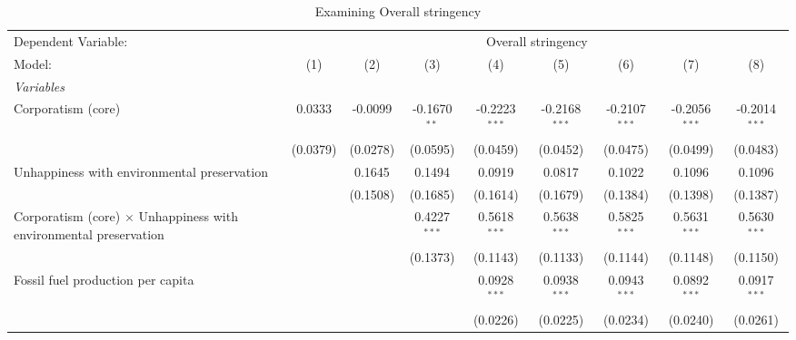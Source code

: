 
\begin{table}[htbp]
   \caption{Examining Overall stringency}
   \centering
   \begin{tabular}{lcccccccc}
      \tabularnewline \midrule \midrule
      Dependent Variable: & \multicolumn{8}{c}{Overall stringency}\\
      Model:                                                                   & (1)      & (2)      & (3)            & (4)             & (5)             & (6)             & (7)             & (8)\\  
      \midrule
      \emph{Variables}\\
      Corporatism (core)                                                       & 0.0333   & -0.0099  & -0.1670$^{**}$ & -0.2223$^{***}$ & -0.2168$^{***}$ & -0.2107$^{***}$ & -0.2056$^{***}$ & -0.2014$^{***}$\\   
                                                                               & (0.0379) & (0.0278) & (0.0595)       & (0.0459)        & (0.0452)        & (0.0475)        & (0.0499)        & (0.0483)\\   
      Unhappiness with environmental preservation                              &          & 0.1645   & 0.1494         & 0.0919          & 0.0817          & 0.1022          & 0.1096          & 0.1096\\   
                                                                               &          & (0.1508) & (0.1685)       & (0.1614)        & (0.1679)        & (0.1384)        & (0.1398)        & (0.1387)\\   
      Corporatism (core) $\times$ Unhappiness with environmental preservation  &          &          & 0.4227$^{***}$ & 0.5618$^{***}$  & 0.5638$^{***}$  & 0.5825$^{***}$  & 0.5631$^{***}$  & 0.5630$^{***}$\\   
                                                                               &          &          & (0.1373)       & (0.1143)        & (0.1133)        & (0.1144)        & (0.1148)        & (0.1150)\\   
      Fossil fuel production per capita                                        &          &          &                & 0.0928$^{***}$  & 0.0938$^{***}$  & 0.0943$^{***}$  & 0.0892$^{***}$  & 0.0917$^{***}$\\   
                                                                               &          &          &                & (0.0226)        & (0.0225)        & (0.0234)        & (0.0240)        & (0.0261)\\   

\end{tabular}
\end{table}
